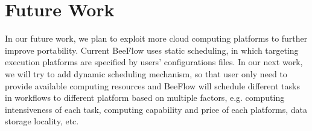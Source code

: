 \section{Future Work}
In our future work, we plan to exploit more cloud computing platforms to further improve portability. Current BeeFlow uses static scheduling, in which targeting execution platforms are specified by users' configurations files. In our next work, we will try to add dynamic scheduling mechanism, so that user only need to provide available computing resources and BeeFlow will schedule different tasks in workflows to different platform based on multiple factors, e.g. computing intensiveness of each task, computing capability and price of each platforms, data storage locality, etc.  
 
